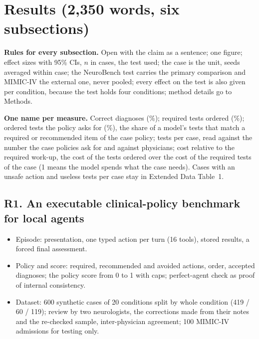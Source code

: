 
\section{Results (2,350 words, six subsections)}\label{sec:results}


\noindent\textbf{Rules for every subsection.} Open with the claim as a sentence; one figure; effect sizes
with 95\% CIs, $n$ in cases, the test used; the case is the unit, seeds averaged within case; the
NeuroBench test carries the primary comparison and MIMIC-IV the external one, never pooled; every
effect on the test is also given per condition, because the test holds four conditions; method
details go to Methods.

\noindent\textbf{One name per measure.} Correct diagnoses (\%); required tests ordered (\%); ordered
tests the policy asks for (\%), the share of a model's tests that match a required or recommended item
of the case policy; tests per case, read against the number the case policies ask for and against
physicians; cost relative to the required work-up, the cost of the tests ordered over the cost of the
required tests of the case (1 means the model spends what the case needs). Cases with an unsafe action
and useless tests per case stay in Extended Data Table~1.

\subsection{R1. An executable clinical-policy benchmark for local agents}\label{sec:benchmark}


\content
\begin{itemize}
\item Episode: presentation, one typed action per turn (16 tools), stored results, a forced final
assessment.
\item Policy and score: required, recommended and avoided actions, order, accepted diagnoses; the policy
score from 0 to 1 with caps; perfect-agent check as proof of internal consistency.
\item Dataset: 600 synthetic cases of 20 conditions split by whole condition (419 / 60 / 119); review by
two neurologists, the corrections made from their notes and the re-checked sample, inter-physician
agreement; 100 MIMIC-IV admissions for testing only.
\end{itemize}

